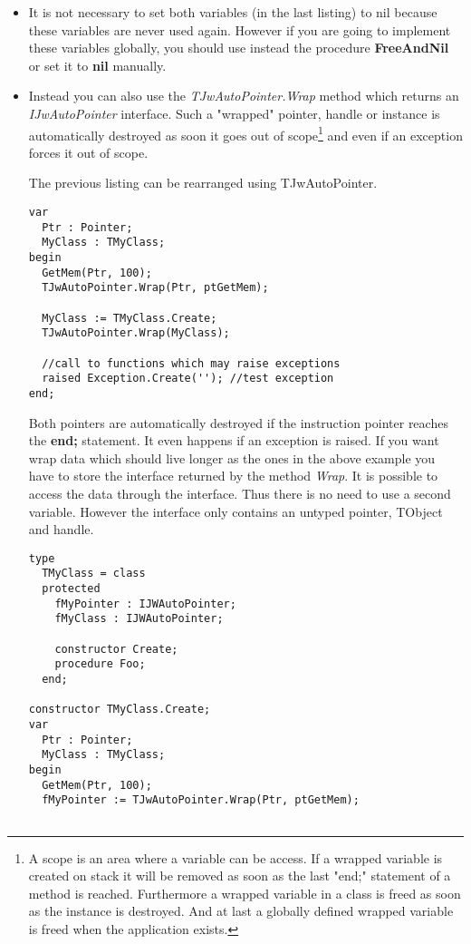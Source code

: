 \documentclass[a4paper,oneside,10pt]{article}
\begin{document}
\begin{itemize}
\item It is not necessary to set both variables (in the last listing) to nil because these variables are never used again. However if you are going to implement these variables globally, you should use instead the procedure \textbf{FreeAndNil} or set it to \textbf{nil} manually.

\item Instead you can also use the \textit{TJwAutoPointer.Wrap} method which returns an \textit{IJwAutoPointer} interface. Such a "wrapped" pointer, handle or instance is automatically destroyed as soon it goes out of scope\footnote{A scope is an area where a variable can be access. If a wrapped variable is created on stack it will be removed as soon as the last "end;" statement of a method is reached. Furthermore a wrapped variable in a class is freed as soon as the instance is destroyed. And at last a globally defined wrapped variable is freed when the application exists.} and even if an exception forces it out of scope.

The previous listing can be rearranged using TJwAutoPointer.
\begin{lstlisting}
var 
  Ptr : Pointer;
  MyClass : TMyClass;
begin
  GetMem(Ptr, 100);
  TJwAutoPointer.Wrap(Ptr, ptGetMem);
  
  MyClass := TMyClass.Create;
  TJwAutoPointer.Wrap(MyClass);
  
  //call to functions which may raise exceptions
  raised Exception.Create(''); //test exception
end; 
\end{lstlisting}
Both pointers are automatically destroyed if the instruction pointer reaches the \textbf{end;} statement. It even happens if an exception is raised.
If you want wrap data which should live longer as the ones in the above example you have to store the interface returned by the method \textit{Wrap}.
It is possible to access the data through the interface. Thus there is no need to use a second variable. However the interface only contains an untyped pointer, TObject and handle.

\begin{lstlisting}
type
  TMyClass = class
  protected
    fMyPointer : IJWAutoPointer;
    fMyClass : IJWAutoPointer;
    
    constructor Create;
    procedure Foo;
  end;
 
constructor TMyClass.Create;
var
  Ptr : Pointer;
  MyClass : TMyClass;
begin
  GetMem(Ptr, 100);
  fMyPointer := TJwAutoPointer.Wrap(Ptr, ptGetMem);
  

\end{lstlisting}
\end{itemize}
\end{document}
